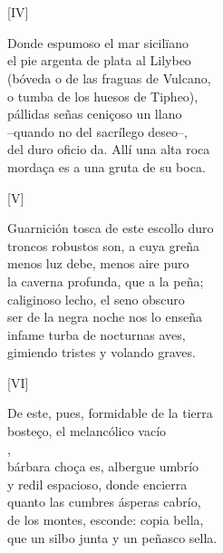 \documentclass[11pt,a4paper,twoside]{article}
\begin{document}
\section*{\centering\fontsize{11}{14}\selectfont[FÁBULA]}
\vspace{-1em}
%
\begin{center}
	[IV]
\end{center}
\pstart
Donde espumoso el mar sicilïano\\
el pie argenta de plata al Lilybeo\\
(bóveda o de las fraguas de Vulcano,\\
o tumba de los huesos de Tipheo),\\
pállidas señas ceniçoso un llano\\
--quando no del sacrílego deseo--,\\
del duro oficio da. Allí una alta roca\\
mordaça es a una gruta de su boca.\par\pend
%
\begin{center}
	[V]
\end{center}
\pstart
Guarnición tosca de este escollo duro\\
troncos robustos son, a cuya greña\\
menos luz debe, menos aire puro\\
la caverna profunda, que a la peña;\\
caliginoso lecho, el seno obscuro\\
ser de la negra noche nos lo enseña\\
infame turba de nocturnas aves,\\
gimiendo tristes y volando graves.\par\pend
%
\begin{center}
	[VI]
\end{center}\pstart
De este, pues, formidable de la tierra\\
bosteço, el melancólico vacío\\
,\\
bárbara choça es, albergue umbrío\\
y redil espacioso, donde encierra\\
quanto las cumbres ásperas cabrío,\\
de los montes, esconde: copia bella,\\
que un silbo junta y un peñasco sella.\par\pend
\end{document}

